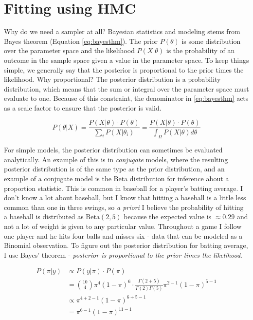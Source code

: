 \documentclass[11pt, oneside, openany]{scrbook}
\begin{document}
\hypertarget{fitting-using-hmc}{%
\section{Fitting using HMC}\label{fitting-using-hmc}}

Why do we need a sampler at all? Bayesian statistics and modeling stems from Bayes theorem (Equation \eqref{eq:bayesthm}). The prior \(P(\theta)\) is some distribution over the parameter space and the likelihood \(P(X | \theta)\) is the probability of an outcome in the sample space given a value in the parameter space. To keep things simple, we generally say that the posterior is proportional to the prior times the likelihood. Why proportional? The posterior distribution is a probability distribution, which means that the sum or integral over the parameter space must evaluate to one. Because of this constraint, the denominator in \eqref{eq:bayesthm} acts as a scale factor to ensure that the posterior is valid.

\begin{equation}
  P(\theta | X) = \frac{P(X | \theta)\cdot P(\theta)}{\sum_i P(X | \theta_i)} =   \frac{P(X | \theta)\cdot P(\theta)}{\int_\Omega P(X | \theta)d\theta}
  \label{eq:bayesthm}
\end{equation}

For simple models, the posterior distribution can sometimes be evaluated analytically. An example of this is in \emph{conjugate} models, where the resulting posterior distribution is of the same type as the prior distribution, and an example of a conjugate model is the Beta distribution for inference about a proportion statistic. This is common in baseball for a player's batting average. I don't know a lot about baseball, but I know that hitting a baseball is a little less common than one in three swings, so \emph{a priori} I believe the probability of hitting a baseball is distributed as \(\mathrm{Beta}(2, 5)\) because the expected value is \(\approx 0.29\) and not a lot of weight is given to any particular value. Throughout a game I follow one player and he hits four balls and misses six - data that can be modeled as a Binomial observation. To figure out the posterior distribution for batting average, I use Bayes' theorem - \emph{posterior is proportional to the prior times the likelihood}.

\begin{align*}
  P(\pi | y) &\propto P(y | \pi) \cdot P(\pi) \\
  &= {10 \choose 4}\pi^{4} (1-\pi)^{6} \cdot \frac{\Gamma(2+5)}{\Gamma(2)\Gamma(5)} \pi^{2-1}(1-\pi)^{5-1} \\
  &\propto \pi^{4+2-1}(1-\pi)^{6+5-1} \\
  &= \pi^{6-1}(1-\pi)^{11-1}
\end{align*}
\end{document}
